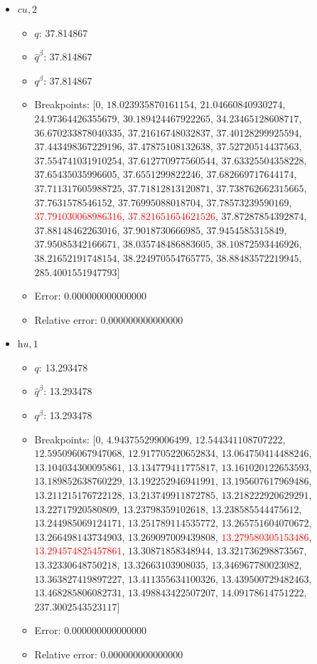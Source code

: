 \documentclass{article}%
\begin{document}
\begin{itemize}
\begin{itemize}
		\item Error: 0.000000000000000%
		\item Relative error: 0.000000000000000%
	\end{itemize}%
	\item $\textit{cu},2$%
	\begin{itemize}%
		\item $q$: 37.814867%
		\item $\hat{q}^\beta$: 37.814867%
		\item $q^\beta$: 37.814867%
		\item Breakpoints: $[$$0$, $18.023935870161154$, $21.04660840930274$, $24.97364426355679$, $30.189424467922265$, $34.23465128608717$, $36.670233878040335$, $37.21616748032837$, $37.40128299925594$, $37.443498367229196$, $37.47875108132638$, $37.52720514437563$, $37.554741031910254$, $37.612770977560544$, $37.63325504358228$, $37.65435035996605$, $37.6551299822246$, $37.682669717644174$, $37.711317605988725$, $37.71812813120871$, $37.738762662315665$, $37.7631578546152$, $37.76995088018704$, $37.78573239590169$, \textcolor{red}{$37.791030068986316$}, \textcolor{red}{$37.821651654621526$}, $37.87287854392874$, $37.88148462263016$, $37.9018730666985$, $37.9454585315849$, $37.95085342166671$, $38.035748486883605$, $38.10872593446926$, $38.21652191748154$, $38.224970554765775$, $38.88483572219945$, $285.4001551947793$$]$%
		\item Error: 0.000000000000000%
		\item Relative error: 0.000000000000000%
	\end{itemize}%
	\item $\textit{hu},1$%
	\begin{itemize}%
		\item $q$: 13.293478%
		\item $\hat{q}^\beta$: 13.293478%
		\item $q^\beta$: 13.293478%
		\item Breakpoints: $[$$0$, $4.943755299006499$, $12.544341108707222$, $12.595096067947068$, $12.917705220652834$, $13.064750414488246$, $13.104034300095861$, $13.134779411775817$, $13.161020122653593$, $13.189852638760229$, $13.192252946941991$, $13.195607617969486$, $13.211215176722128$, $13.213749911872785$, $13.218222920629291$, $13.22717920580809$, $13.23798359102618$, $13.238585544475612$, $13.244985069124171$, $13.251789114535772$, $13.265751604070672$, $13.266498143734903$, $13.269097009439808$, \textcolor{red}{$13.279580305153486$}, \textcolor{red}{$13.294574825457861$}, $13.30871858348944$, $13.321736298873567$, $13.32330648750218$, $13.32663103908035$, $13.346967780023082$, $13.363827419897227$, $13.411355634100326$, $13.439500729482463$, $13.468285806082731$, $13.498843422507207$, $14.09178614751222$, $237.3002543523117$$]$%
		\item Error: 0.000000000000000%
		\item Relative error: 0.000000000000000%
	\end{itemize}%
\end{itemize}%
\end{document}
